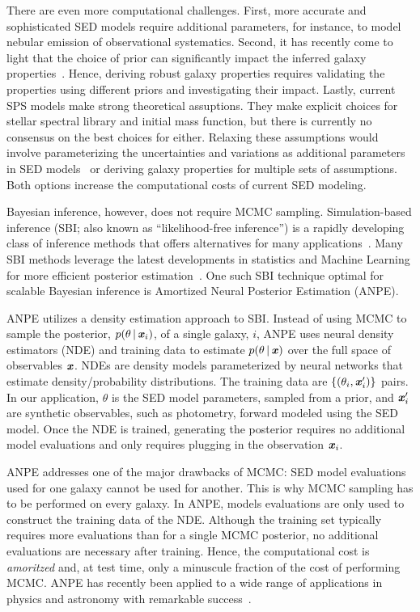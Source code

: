There are even more computational challenges.
First, more accurate and sophisticated SED models require additional
parameters, for instance, to model nebular emission of observational
systematics. 
Second, it has recently come to light that the choice of prior can
significantly impact the inferred galaxy 
properties~\citep{carnall2018, leja2017, hahn2022}. 
Hence, deriving robust galaxy properties requires validating the properties
using different priors and investigating their impact. 
Lastly, current SPS models make strong theoretical assuptions. 
They make explicit choices for stellar spectral library and initial mass
function, but there is currently no consensus on the best choices for either.
Relaxing these assumptions would involve parameterizing the uncertainties and
variations as additional parameters in SED models~\citep{conroy2009,
conroy2010c} or deriving galaxy properties for multiple sets of assumptions. 
Both options increase the computational costs of current SED modeling.  

Bayesian inference, however, does not require MCMC sampling. 
Simulation-based inference (SBI; also known as ``likelihood-free inference'')
is a rapidly developing class of inference methods that offers alternatives for
many applications~\citep[see][and reference therein]{cranmer2020}.
Many SBI methods leverage the latest developments in statistics and Machine
Learning for more efficient posterior estimation~\citep{papamakarios2017,
alsing2019a, hahn2019c, dax2021, huppenkothen2021, zhang2021}. 
One such SBI technique optimal for scalable Bayesian inference is Amortized
Neural Posterior Estimation (ANPE). 

ANPE utilizes a density estimation approach to SBI. 
Instead of using MCMC to sample the posterior, $p(\theta \,|\, \textbf{\textit{x}}_i)$, 
of a single galaxy, $i$, ANPE uses neural density estimators (NDE) and training
data to estimate $p(\theta\,|\,\textbf{\textit{x}})$  over the full space of observables
$\textbf{\textit{x}}$.
NDEs are density models parameterized by neural networks that estimate
density/probability distributions. 
The training data are $\{(\theta_i, \textbf{\textit{x}}'_i)\}$ pairs.
In our application, $\theta$ is the SED model parameters, sampled from a 
prior, and $\textbf{\textit{x}}'_i$ are synthetic observables, such as photometry, forward
modeled using the SED model. 
Once the NDE is trained, generating the posterior requires no additional model
evaluations and only requires plugging in the observation $\textbf{\textit{x}}_i$.

ANPE addresses one of the major drawbacks of MCMC: SED model evaluations used
for one galaxy cannot be used for another.
This is why MCMC sampling has to be performed on every galaxy. 
In ANPE, models evaluations are only used to construct the training data of the
NDE. 
Although the training set typically requires more evaluations than for a single
MCMC posterior, no additional evaluations are necessary after training. 
Hence, the computational cost is \emph{amoritzed} and, at test time, only a
minuscule fraction of the cost of performing MCMC.
ANPE has recently been applied to a wide range of applications in physics and
astronomy with remarkable success~\citep{stein2020, wong2020, dax2021,
zhang2021}.

